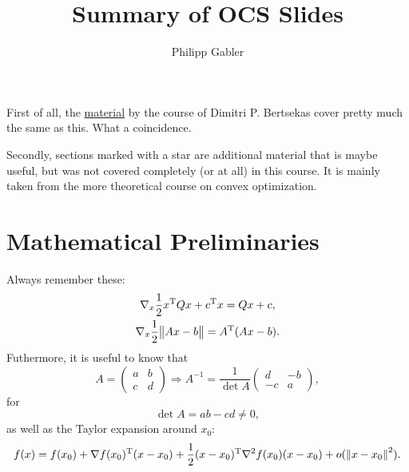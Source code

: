 \documentclass{article}
\title{Summary of OCS Slides}
\author{Philipp Gabler}
\begin{document}
\maketitle

\tableofcontents
\newpage


\noindent First of all, the \href{http://web.mit.edu/6.252/www/LectureNotes/}{material} by the
course of Dimitri P. Bertsekas cover pretty much the same as this. What a coincidence.

Secondly, sections marked with a star are additional material that is maybe useful, but was not
covered completely (or at all) in this course.  It is mainly taken from the more theoretical course
on convex optimization.

\section{Mathematical Preliminaries}


\label{s:basics}

Always remember these:
\begin{gather*}
  \nabla_x \frac{1}{2} \T{x}Qx + \T{c}x = Qx + c, \\
  \nabla_x \frac{1}{2} \enVert[1]{Ax - b} = \T{A}(Ax - b).
\end{gather*}
Futhermore, it is useful to know that
\begin{equation*}
  A = \begin{pmatrix}
    a & b \\
    c & d
  \end{pmatrix} \Rightarrow A^{-1} = \frac{1}{\det A}
  \begin{pmatrix}
    d & -b \\
    -c & a
  \end{pmatrix},
\end{equation*}
for
\begin{equation*}
  \det A = ab - cd \neq 0,
\end{equation*}
as well as the Taylor expansion around \(x_0\):
\begin{equation*}
  f(x) = f(x_0) + \T{\nabla f(x_0)}(x - x_0) + \frac{1}{2} \T{(x - x_0)}\nabla^2 f(x_0)(x - x_0)
  + o(\,\enVert{x - x_0}^2).
\end{equation*}


\label{s:definiteness}
\end{document}
